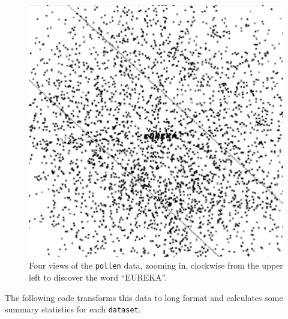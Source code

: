 \documentclass[
  letterpaper,
  10pt,
  krantz2]{krantz}
\begin{document}
\begin{figure}
\begin{minipage}[t]{0.50\linewidth}
{{\includegraphics{images/pollen-eureka3.png}

}

}

\end{minipage}%

\caption{\label{fig-pollen-eureka}Four views of the \texttt{pollen}
data, zooming in, clockwise from the upper left to discover the word
``EUREKA''.}

\end{figure}

The following code transforms this data to long format and calculates
some summary statistics for each \texttt{dataset}.
\end{document}
